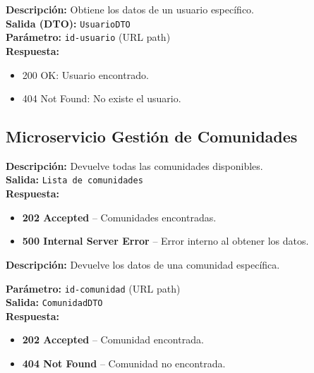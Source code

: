 \vspace{0.5em}

\begin{tcolorbox}[colback=blue!5!white, colframe=blue!75!black, title=\texttt{/usuario/\{id-usuario\}} -- GET]
\textbf{Descripción:} Obtiene los datos de un usuario específico. \\
\textbf{Salida (DTO):} \texttt{UsuarioDTO} \\
\textbf{Parámetro:} \texttt{id-usuario} (URL path) \\
\textbf{Respuesta:}
\begin{itemize}[label=--]
    \item 200 OK: Usuario encontrado.
    \item 404 Not Found: No existe el usuario.
\end{itemize}
\end{tcolorbox}


\subsection{Microservicio Gestión de Comunidades}
\begin{tcolorbox}[title=\texttt{GET /comunidades}, colback=blue!5!white, colframe=blue!75!black]
\textbf{Descripción:} Devuelve todas las comunidades disponibles. \\
\textbf{Salida:} \texttt{Lista de comunidades} \\
\textbf{Respuesta:}
\begin{itemize}[label=--]
    \item \textbf{202 Accepted} – Comunidades encontradas.
    \item \textbf{500 Internal Server Error} – Error interno al obtener los datos.
\end{itemize}
\end{tcolorbox}

\begin{tcolorbox}[title=\texttt{GET /comunidades/\{id-comunidad\}}, colback=blue!5, colframe=blue!80!black]
\textbf{Descripción:} Devuelve los datos de una comunidad específica.

\textbf{Parámetro:} \texttt{id-comunidad} (URL path) \\
\textbf{Salida:} \texttt{ComunidadDTO}\\
\textbf{Respuesta:}
\begin{itemize}[label=--]
    \item \textbf{202 Accepted} – Comunidad encontrada.
    \item \textbf{404 Not Found} – Comunidad no encontrada.
\end{itemize}
\end{tcolorbox}

